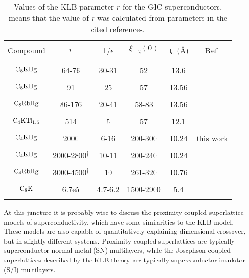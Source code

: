 \begin{table}
\caption[Values  of the   KLB  parameter $r$   for the GIC
superconductors.]{Values  of the   KLB  parameter $r$   for the
GIC superconductors.  \dag means that the value of $r$ was calculated from
parameters in the cited references.}
\label{klbgics}
\begin{center}
\begin{tabular}{|c|ccccc|}
\hline
& & & & & \\
Compound & $r$ & 1/$\epsilon$ & $\xi_{\parallel \hat{c}}(0)$ & $\rm I_c$ (\AA) & Ref.\\
& & & & & \\
\hline
& & & & & \\
$\rm C_8KHg$ & 64-76& 30-31& 52 & 13.6  & \cite{koike81,tanuma81} \\
& & & & & \\
$\rm C_8KHg$ & 91& 25& 57 & 13.56  & \cite{pendrys83} \\
& & & & & \\
$\rm C_8RbHg$ & 86-176& 20-41& 58-83 & 13.56  & \cite{iye82} \\
& & & & & \\
$\rm C_4KTl_{1.5}$ & 514& 5 &57 & 12.1 & \cite{pendrys83,vogel81} \\
& & & & & \\
$\rm C_4KHg$ & 2000& 6-16& 200-300 & 10.24  & this work \\
& & & & & \\
$\rm C_4KHg$ & 2000-2800$^{\dagger}$& 10-11& 200-240 & 10.24  & \cite{iye83} \\
& & & & & \\
$\rm C_4RbHg$ & 3000-4500$^{\dagger}$& 10& 261-320 & 10.76  & \cite{iye82} \\
& & & & & \\
$\rm C_8K$ & 6.7e5& 4.7-6.2 & 1500-2900& 5.4  & \cite{koike81,koike80} \\
& & & & & \\
\hline
\end{tabular}
\end{center}
\end{table}

        
        At   this   juncture  it    is   probably   wise  to   discuss  the
proximity-coupled           superlattice            models               of
superconductivity\cite{biagi85,takahashi86b}, which  have some similarities
to  the  KLB  model.  These  models    are also   capable of quantitatively
explaining  dimensional   crossover, but  in  slightly   different systems.
Proximity-coupled superlattices are  typically  superconductor-normal-metal
(SN)  multilayers, while  the  Josephson-coupled superlattices described by
the KLB theory  are typically superconductor-insulator   (S/I) multilayers.

